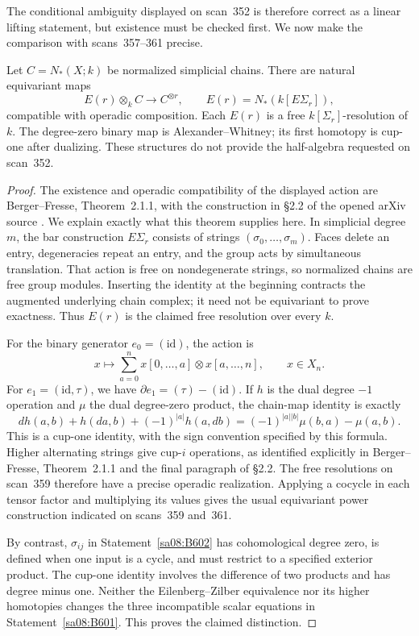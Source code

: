 The conditional ambiguity displayed on scan~352 is therefore
correct as a linear lifting statement, but existence must be checked
first. We now make the comparison with scans~357--361 precise.

\begin{theorem}\label{sa08:B603}
Let $C=N_*(X;k)$ be normalized simplicial chains. There are natural
equivariant maps
\[
 E(r)\otimes_k C\longrightarrow C^{\otimes r},\qquad
 E(r)=N_*(k[E\Sigma_r]),
\]
compatible with operadic composition. Each $E(r)$ is a free
$k[\Sigma_r]$-resolution of $k$. The degree-zero binary map is
Alexander--Whitney; its first homotopy is cup-one after dualizing.
These structures do not provide the half-algebra requested on
scan~352.
\end{theorem}
\begin{proof}
The existence and operadic compatibility of the displayed action
are Berger--Fresse, Theorem~2.1.1, with the construction in
\S2.2 of the opened arXiv source \cite{berger-fresse}.
We explain exactly what this theorem supplies here. In simplicial
degree $m$, the bar construction $E\Sigma_r$ consists of strings
$(\sigma_0,\ldots,\sigma_m)$. Faces delete an entry, degeneracies
repeat an entry, and the group acts by simultaneous translation.
That action is free on nondegenerate strings, so normalized chains
are free group modules. Inserting the identity at the beginning
contracts the augmented underlying chain complex; it need not be
equivariant to prove exactness. Thus $E(r)$ is the claimed free
resolution over every $k$.

For the binary generator $e_0=(\mathrm{id})$, the action is
\[
 x\longmapsto\sum_{a=0}^n
 x[0,\ldots,a]\otimes x[a,\ldots,n],\qquad x\in X_n.
\]
For $e_1=(\mathrm{id},\tau)$, we have
$\partial e_1=(\tau)-(\mathrm{id})$. If $h$ is the dual degree
$-1$ operation and $\mu$ the dual degree-zero product, the chain-map
identity is exactly
\[
 d h(a,b)+h(da,b)+(-1)^{|a|}h(a,db)
 =(-1)^{|a||b|}\mu(b,a)-\mu(a,b).
\]
This is a cup-one identity, with the sign convention specified by
this formula. Higher alternating strings give cup-$i$ operations,
as identified explicitly in Berger--Fresse, Theorem~2.1.1 and
the final paragraph of \S2.2. The free resolutions on scan~359
therefore have a precise operadic realization. Applying a cocycle
in each tensor factor and multiplying its values gives the usual
equivariant power construction indicated on scans~359 and~361.

By contrast, $\sigma_{ij}$ in Statement~\ref{sa08:B602} has
cohomological degree zero, is defined when one input is a cycle,
and must restrict to a specified exterior product. The cup-one
identity involves the difference of two products and has degree
minus one. Neither the Eilenberg--Zilber equivalence nor its higher
homotopies changes the three incompatible scalar equations in
Statement~\ref{sa08:B601}. This proves the claimed distinction.
\end{proof}

